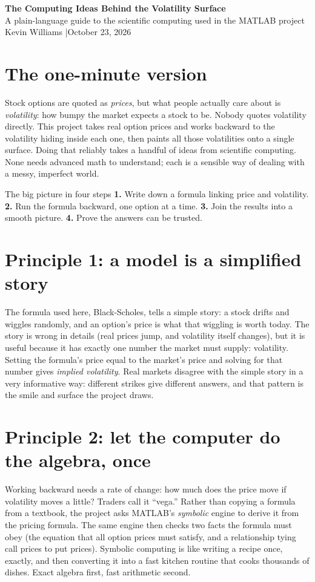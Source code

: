 \documentclass[11pt]{article}
\newcommand{\titleblock}[2]{\begin{center}{\LARGE\bfseries\color{accent}#1}\\[0.4em]{\large #2}\\[0.3em]{\small Kevin Williams \quad|\quad October 23, 2026}\end{center}\vspace{0.3em}}
\begin{document}
\titleblock{The Computing Ideas Behind the Volatility Surface}{A plain-language guide to the scientific computing used in the MATLAB project}

\section*{The one-minute version}
Stock options are quoted as \emph{prices}, but what people actually care about is \emph{volatility}: how bumpy the market expects a stock to be. Nobody quotes volatility directly. This project takes real option prices and works backward to the volatility hiding inside each one, then paints all those volatilities onto a single surface. Doing that reliably takes a handful of ideas from scientific computing. None needs advanced math to understand; each is a sensible way of dealing with a messy, imperfect world.

\begin{callout}{The big picture in four steps}
\textbf{1.} Write down a formula linking price and volatility. \quad \textbf{2.} Run the formula backward, one option at a time. \quad \textbf{3.} Join the results into a smooth picture. \quad \textbf{4.} Prove the answers can be trusted.
\end{callout}

\section{Principle 1: a model is a simplified story}
The formula used here, Black-Scholes, tells a simple story: a stock drifts and wiggles randomly, and an option's price is what that wiggling is worth today. The story is wrong in details (real prices jump, and volatility itself changes), but it is useful because it has exactly one number the market must supply: volatility. Setting the formula's price equal to the market's price and solving for that number gives \emph{implied volatility}. Real markets disagree with the simple story in a very informative way: different strikes give different answers, and that pattern is the smile and surface the project draws.

\section{Principle 2: let the computer do the algebra, once}
Working backward needs a rate of change: how much does the price move if volatility moves a little? Traders call it ``vega.'' Rather than copying a formula from a textbook, the project asks MATLAB's \emph{symbolic} engine to derive it from the pricing formula. The same engine then checks two facts the formula must obey (the equation that all option prices must satisfy, and a relationship tying call prices to put prices). Symbolic computing is like writing a recipe once, exactly, and then converting it into a fast kitchen routine that cooks thousands of dishes. Exact algebra first, fast arithmetic second.
\end{document}
